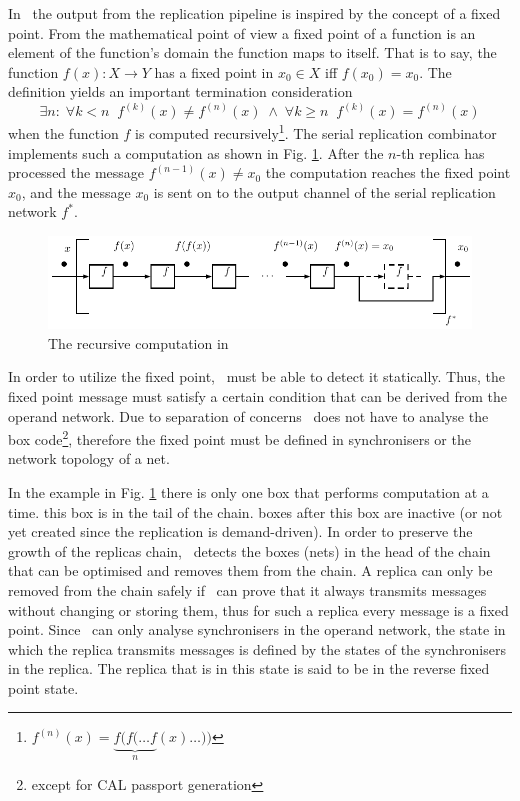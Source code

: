 In \ak\, the output from the replication pipeline is inspired by the concept of a fixed point. From the mathematical point of view a fixed point of a function is an element of the function's domain the function maps to itself. That is to say, the function $f(x): X \to Y$ has a fixed point in $x_0 \in X$ iff $f(x_0) = x_0$. The definition yields an important termination consideration
\begin{equation}
\exists n: \; \forall k<n \;\; f^{(k)}(x) \neq f^{(n)}(x) \; \land \; \forall k \ge n \;\; f^{(k)}(x) = f^{(n)}(x) \nonumber
\end{equation}
when the function $f$ is computed recursively\footnote{$f^{(n)}(x) = \underbrace{f(f(\dots f}_n (x) \dots))$}. The serial replication combinator implements such a computation as shown in Fig. \ref{fig:fp}. After the $n$-th replica has processed the message $f^{(n-1)}(x) \neq x_0$ the computation reaches the fixed point $x_0$, and the message $x_0$ is sent on to the output channel of the serial replication network $f^{*}$.
\begin{figure}[h!]
\centering
\includegraphics[scale=0.8]{figs/chapter_03_fp.pdf}
\caption{The recursive computation in \ak\ }
\label{fig:fp}
\end{figure}

In order to utilize the fixed point, \ak\ must be able to detect it statically. Thus, the fixed point message must satisfy a certain condition that can be derived from the operand network. Due to separation of concerns \ak\ does not have to analyse the box code\footnote{except for CAL passport generation}, therefore the fixed point must be defined in synchronisers or the network topology of a net.


In the example in Fig. \ref{fig:fp} there is only one box that performs computation at a time. this box is in the tail of the chain. boxes after this box are inactive (or not yet created since the replication is demand-driven). In order to preserve the growth of the replicas chain, \ak\ detects the boxes (nets) in the head of the chain that can be optimised and removes them from the chain. A replica can only be removed from the chain safely if \ak\ can prove that it always transmits messages without changing or storing them, thus for such a replica every message is a fixed point. Since \ak\ can only analyse synchronisers in the operand network, the state in which the replica transmits messages is defined by the states of the synchronisers in the replica. The replica that is in this state is said to be in the reverse fixed point state.



